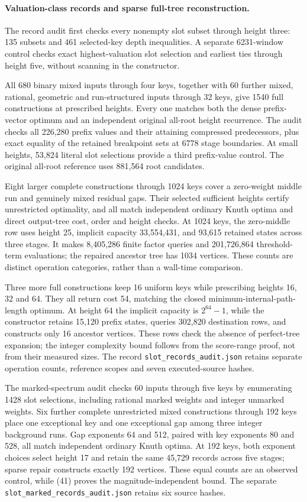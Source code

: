 \documentclass[11pt]{article}
\begin{document}
\paragraph{Valuation-class records and sparse full-tree reconstruction.}
The record audit first checks every nonempty slot subset through height
three: 135 subsets and 461 selected-key depth inequalities. A separate
6231-window control checks exact highest-valuation slot selection and
earliest ties through height five, without scanning in the constructor.

All 680 binary mixed inputs through four keys, together with 60 further
mixed, rational, geometric and run-structured inputs through 32 keys,
give 1540 full constructions at prescribed heights. Every one matches
both the dense prefix-vector optimum and an independent original all-root
height recurrence. The audit checks all 226,280 prefix values and their
attaining compressed predecessors, plus exact equality of the retained
breakpoint sets at 6778 stage boundaries. At small heights, 53,824 literal
slot selections provide a third prefix-value control. The original
all-root reference uses 881,564 root candidates.

Eight larger complete constructions through 1024 keys cover a zero-weight
middle run and genuinely mixed residual gaps. Their selected sufficient
heights certify unrestricted optimality, and all match independent ordinary
Knuth optima and direct output-tree cost, order and height checks. At
1024 keys, the zero-middle row uses height 25, implicit capacity
33,554,431, and 93,615 retained states across three stages. It makes
8,405,286 finite factor queries and 201,726,864 threshold-term evaluations;
the repaired ancestor tree has 1034 vertices. These counts are distinct
operation categories, rather than a wall-time comparison.

Three more full constructions keep 16 uniform keys while prescribing
heights 16, 32 and 64. They all return cost 54, matching the closed
minimum-internal-path-length optimum. At height 64 the implicit capacity is
$2^{64}-1$, while the constructor retains 15,120 prefix states, queries
302,820 destination rows, and constructs only 16 ancestor vertices. These
rows check the absence of perfect-tree expansion; the integer complexity
bound follows from the score-range proof, not from their measured sizes.
The record \texttt{slot\_records\_audit.json} retains separate operation
counts, reference scopes and seven executed-source hashes.

The marked-spectrum audit checks 60 inputs through five keys by enumerating
1428 slot selections, including rational marked weights and integer
unmarked weights. Six further complete unrestricted mixed constructions
through 192 keys place one exceptional key and one exceptional gap among
three integer background runs. Gap exponents 64 and 512, paired with key
exponents 80 and 528, all match independent ordinary Knuth optima.
At 192 keys, both exponent choices select height 17 and retain the same
45,729 records across five stages; sparse repair constructs exactly 192
vertices. These equal counts are an observed control, while
(41) proves the magnitude-independent bound.
The separate \texttt{slot\_marked\_records\_audit.json} retains six source hashes.
\end{document}
